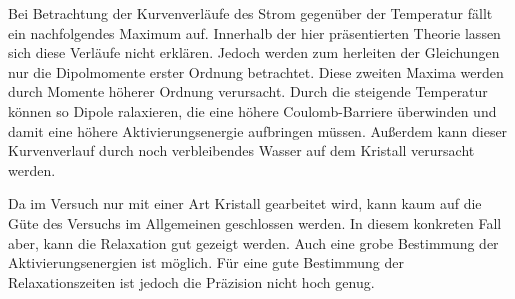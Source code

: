 Bei Betrachtung der Kurvenverläufe des Strom gegenüber der Temperatur fällt ein nachfolgendes Maximum auf. Innerhalb der hier präsentierten Theorie lassen sich diese Verläufe nicht erklären. Jedoch werden zum herleiten der Gleichungen nur die Dipolmomente erster Ordnung betrachtet. Diese zweiten Maxima werden durch Momente höherer Ordnung verursacht. Durch die steigende Temperatur können so Dipole ralaxieren, die eine höhere Coulomb-Barriere überwinden und damit eine höhere Aktivierungsenergie aufbringen müssen. Außerdem kann dieser Kurvenverlauf durch noch verbleibendes Wasser auf dem Kristall verursacht werden. 


Da im Versuch nur mit einer Art Kristall gearbeitet wird, kann kaum auf die Güte des Versuchs im Allgemeinen geschlossen werden. In diesem konkreten Fall aber, kann die Relaxation gut gezeigt werden. Auch eine grobe Bestimmung der Aktivierungsenergien ist möglich. Für eine gute Bestimmung der Relaxationszeiten ist jedoch die Präzision nicht hoch genug.
